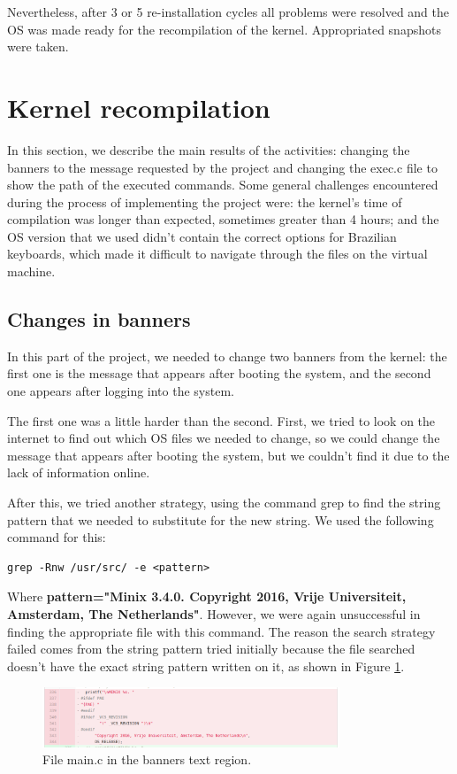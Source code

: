 Nevertheless, after 3 or 5 re-installation cycles all problems were resolved and the OS was made ready for the recompilation of the kernel. Appropriated snapshots were taken.

\section{Kernel recompilation}\label{reco}
In this section, we describe the main results of the activities: changing the banners to the message requested by the project and changing the exec.c file to show the path of the executed commands. Some general challenges encountered during the process of implementing the project were: the kernel's time of compilation was longer than expected, sometimes greater than 4 hours; and the OS version that we used didn't contain the correct options for Brazilian keyboards, which made it difficult to navigate through the files on the virtual machine.  
\subsection{Changes in banners}\label{bann}
In this part of the project, we needed to change two banners from the kernel: the first one is the message that appears after booting the system, and the second one appears after logging into the system.

The first one was a little harder than the second. First, we tried to look on the internet to find out which OS files we needed to change, so we could change the message that appears after booting the system, but we couldn't find it due to the lack of information online.

After this, we tried another strategy, using the command grep to find the string pattern that we needed to substitute for the new string. We used the following command for this:

\begin{lstlisting}
grep -Rnw /usr/src/ -e <pattern>
\end{lstlisting}

Where \textbf{pattern="Minix 3.4.0. Copyright 2016, Vrije Universiteit, Amsterdam, The Netherlands"}. However, we were again unsuccessful in finding the appropriate file with this command. The reason the search strategy failed comes from the string pattern tried initially because the file searched doesn't have the exact string pattern written on it, as shown in Figure \ref{fig-banners}.

\begin{figure}[h!]
\centering
\includegraphics[width=3.5in]{photo/kernel_banner_original.png}
\caption{File main.c in the banners text region.}
\label{fig-banners}
\end{figure}

